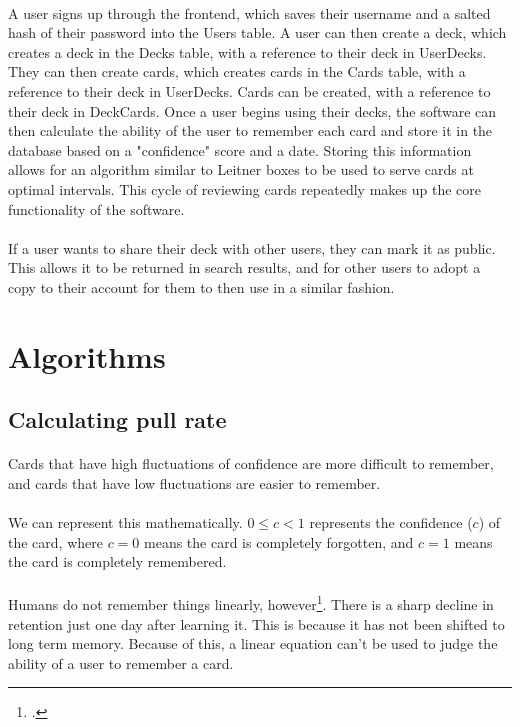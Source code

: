 \documentclass{report}
\begin{document}
\paragraph{}
A user signs up through the frontend, which saves their username and a salted hash of their password into the Users table. A user can then create a deck, which creates a deck in the Decks table, with a reference to their deck in UserDecks. They can then create cards, which creates cards in the Cards table, with a reference to their deck in UserDecks. Cards can be created, with a reference to their deck in DeckCards. Once a user begins using their decks, the software can then calculate the ability of the user to remember each card and store it in the database based on a "confidence" score and a date. Storing this information allows for an algorithm similar to Leitner boxes to be used to serve cards at optimal intervals. This cycle of reviewing cards repeatedly makes up the core functionality of the software.

\paragraph{}
If a user wants to share their deck with other users, they can mark it as public. This allows it to be returned in search results, and for other users to adopt a copy to their account for them to then use in a similar fashion.

\section{Algorithms}
\subsection{Calculating pull rate}
\paragraph{}
Cards that have high fluctuations of confidence are more difficult to remember, and cards that have low fluctuations are easier to remember.
\paragraph{}
We can represent this mathematically. $0 \leq c < 1$ represents the confidence ($c$) of the card, where $c = 0$ means the card is completely forgotten, and $c = 1$ means the card is completely remembered. 

\paragraph{}
Humans do not remember things linearly, however\footcite{ForgettingCurve}. There is a sharp decline in retention just one day after learning it. This is because it has not been shifted to long term memory. Because of this, a linear equation can't be used to judge the ability of a user to remember a card. 
\end{document}
